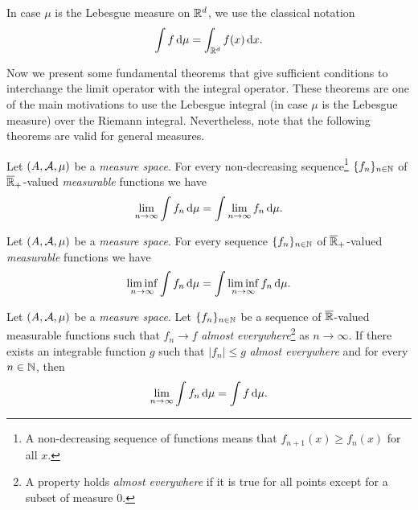 In case $\mu$ is the Lebesgue measure on $\R^d$, we use the classical notation
\begin{align*}
    \int f \,\d\mu = \int_{\R^d} f(x)\,\d x.
\end{align*}

Now we present some fundamental theorems that give sufficient conditions to interchange the limit operator with the integral operator.
%
These theorems are one of the main motivations to use the Lebesgue integral (in case $\mu$ is the Lebesgue measure) over the Riemann integral.
%
Nevertheless, note that the following theorems are valid for general measures.

\begin{theorem}
    Let $(A,\cal A, \mu)$ be a \textit{measure space}. For every non-decreasing sequence\footnote{A non-decreasing sequence of functions means that $f_{n+1}(x)\ge f_n(x)$ for all $x$.} $\{f_n\}_{n\in\N}$ of $\overline\R_+$-valued \textit{measurable} functions we have
    \begin{align*}
        \lim_{n\to\infty} \int f_n \,\d\mu = \int \lim_{n\to\infty} f_n \,\d\mu.
    \end{align*}
\end{theorem}

\begin{theorem}
    Let $(A,\cal A, \mu)$ be a \textit{measure space}. For every sequence $\{f_n\}_{n\in\N}$ of $\overline\R_+$-valued \textit{measurable} functions we have
    \begin{align*}
        \liminf_{n\to\infty} \int f_n \,\d\mu = \int \liminf_{n\to\infty} f_n \,\d\mu.
    \end{align*}
\end{theorem}

\begin{theorem}
    Let $(A,\cal A, \mu)$ be a \textit{measure space}. Let $\{f_n\}_{n\in\N}$ be a sequence of $\overline{\R}$-valued measurable functions such that $f_n \to f$ \textit{almost everywhere}\footnote{A property holds \textit{almost everywhere} if it is true for all points except for a subset of measure $0$.} as $n\to\infty$.
    If there exists an integrable function $g$ such that $|f_n|\le g$ \textit{almost everywhere} and for every $n\in\N$, then
    \begin{align*}
        \lim_{n\to\infty} \int f_n \,\d\mu = \int f \,\d\mu.
    \end{align*}
\end{theorem}

